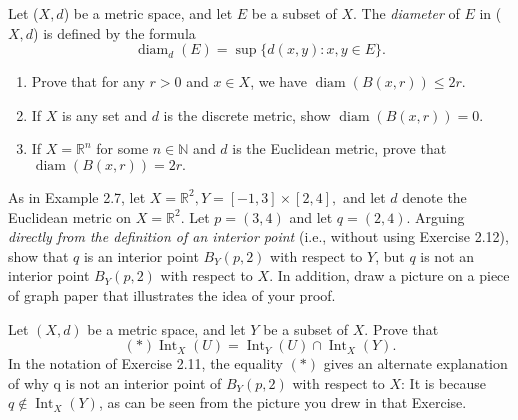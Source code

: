 \documentclass[12pt,letterpaper,boxed]{hmcpset}
\DeclareMathOperator{\diam}{diam}
\DeclareMathOperator{\Int}{Int}
\begin{document}
\begin{problem}[Exercise 2.8.]
Let ($X, d$) be a metric space, and let $E$ be a subset of $X$. The \textit{diameter} of $E$ in ($X,d$) is defined by the formula $$\diam_{d}(E) = \sup\{d(x,y) : x,y \in E\}.$$

\vspace{-2mm}
\begin{enumerate}
	\itemsep0em
	\item Prove that for any $r > 0$ and $x \in X$, we have $\diam(B(x,r))\leq 2r.$
	\item If $X$ is any set and $d$ is the discrete metric, show $\diam(B(x, r)) = 0.$
	\item If $X = \mathbb{R}^{n}$ for some $n \in \mathbb{N}$ and $d$ is the Euclidean metric, prove that $\diam(B(x,r)) = 2r.$ 
\end{enumerate}

\end{problem}
\begin{solution}

\end{solution}

\begin{problem}[Exercise 2.11.]
As in Example 2.7, let $X = \mathbb{R}^{2}, Y = [-1,3]\times[2,4],$ and let $d$ denote the Euclidean metric on $X = \mathbb{R}^{2}.$ Let $p = (3,4)$ and let $q = (2, 4)$. Arguing \textit{directly from the definition of an interior point} (i.e., without using Exercise 2.12), show that $q$ is an interior point $B_{Y}(p,2)$ with respect to $Y$, but $q$ is not an interior point $B_{Y}(p,2)$ with respect to $X$. In addition, draw a picture on a piece of graph paper that illustrates the idea of your proof.
\end{problem}
\begin{solution}

\end{solution}


\begin{problem}[Exercise 2.12.]
Let $(X, d)$ be a metric space, and let $Y$ be a subset of $X$. Prove that $$(*) \Int_{X}(U) = \Int_{Y}(U)\cap\Int_{X}(Y).$$
In the notation of Exercise 2.11, the equality $(*)$ gives an alternate explanation of why q is not an interior point of $B_{Y}(p, 2)$ with respect to $X$: It is because $q \notin \Int_{X}(Y)$, as can be seen from the picture you drew in that Exercise.
\end{problem}
\begin{solution}

\end{solution}
\end{document}
